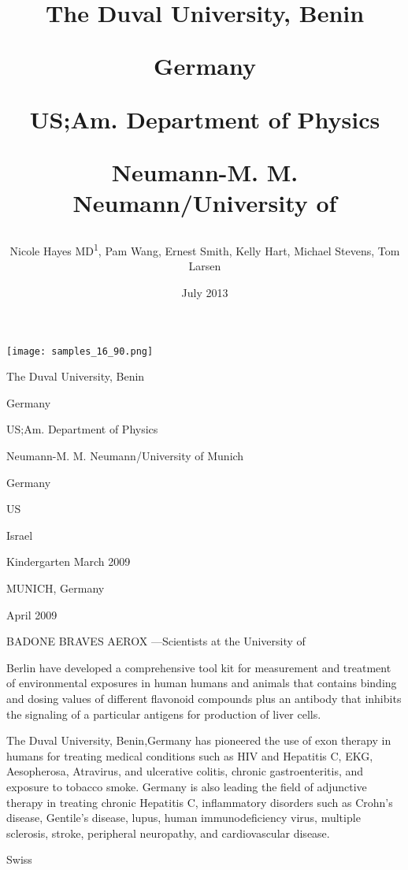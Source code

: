 \documentclass{article}
\title{The Duval University, Benin

Germany

US;Am. Department of Physics

Neumann-M. M. Neumann/University of}
\author{Nicole Hayes MD\textsuperscript{1},  Pam Wang,  Ernest Smith,  Kelly Hart,  Michael Stevens,  Tom Larsen}
\affil{\textsuperscript{1}Johns Hopkins University}
\date{July 2013}
\begin{document}
\maketitle

\begin{center}
\begin{minipage}{0.75\linewidth}
\texttt{[image: samples\_16\_90.png]}
\end{minipage}
\end{center}

The Duval University, Benin

Germany

US;Am. Department of Physics

Neumann-M. M. Neumann/University of Munich

Germany

US

Israel

Kindergarten March 2009

MUNICH, Germany

April 2009

BADONE BRAVES AEROX —Scientists at the University of

Berlin have developed a comprehensive tool kit for measurement and treatment of environmental exposures in human humans and animals that contains binding and dosing values of different flavonoid compounds plus an antibody that inhibits the signaling of a particular antigens for production of liver cells.

The Duval University, Benin,Germany has pioneered the use of exon therapy in humans for treating medical conditions such as HIV and Hepatitis C, EKG, Aesopherosa, Atravirus, and ulcerative colitis, chronic gastroenteritis, and exposure to tobacco smoke. Germany is also leading the field of adjunctive therapy in treating chronic Hepatitis C, inflammatory disorders such as Crohn’s disease, Gentile’s disease, lupus, human immunodeficiency virus, multiple sclerosis, stroke, peripheral neuropathy, and cardiovascular disease.

Swiss
\end{document}
